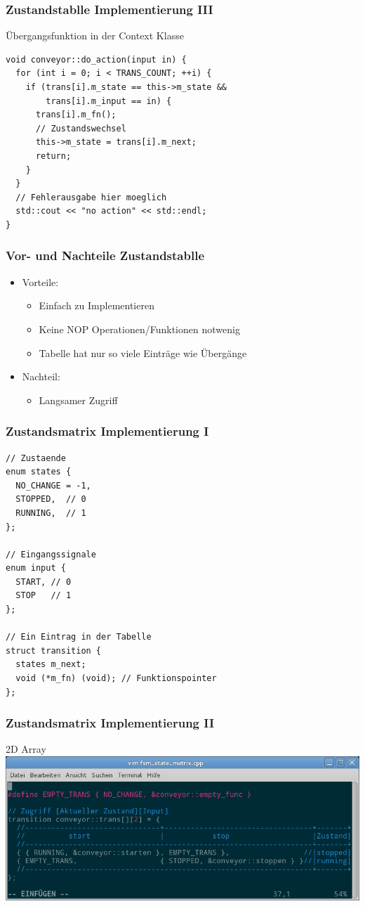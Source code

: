 \documentclass{beamer}
\begin{document}
\begin{frame}[fragile]
 \frametitle{Zustandstablle Implementierung III}
 \"Ubergangsfunktion in der Context Klasse
 \begin{lstlisting}
void conveyor::do_action(input in) {
  for (int i = 0; i < TRANS_COUNT; ++i) {
    if (trans[i].m_state == this->m_state &&
        trans[i].m_input == in) {
      trans[i].m_fn();
      // Zustandswechsel
      this->m_state = trans[i].m_next;
      return;
    }
  }
  // Fehlerausgabe hier moeglich
  std::cout << "no action" << std::endl;
}
 \end{lstlisting}
\end{frame}

\begin{frame}
 \frametitle{Vor- und Nachteile Zustandstablle}
 \begin{itemize}
  \item Vorteile:
  \begin{itemize}
   \item Einfach zu Implementieren
   \item Keine NOP Operationen/Funktionen notwenig
   \item Tabelle hat nur so viele Eintr\"age wie \"Uberg\"ange
  \end{itemize}
  \item Nachteil:
  \begin{itemize}
   \item Langsamer Zugriff
  \end{itemize}
 \end{itemize}
\end{frame}

\begin{frame}[fragile]
 \frametitle{Zustandsmatrix Implementierung I}
 \begin{lstlisting}
// Zustaende
enum states {
  NO_CHANGE = -1,
  STOPPED,  // 0
  RUNNING,  // 1
};

// Eingangssignale
enum input {
  START, // 0
  STOP   // 1
};

// Ein Eintrag in der Tabelle
struct transition {
  states m_next;
  void (*m_fn) (void); // Funktionspointer
};
 \end{lstlisting}
\end{frame}

\begin{frame}
 \frametitle{Zustandsmatrix Implementierung II}
 2D Array
 \includegraphics[scale=.4]{img/matrix_vim.png}
\end{frame}
\end{document}
